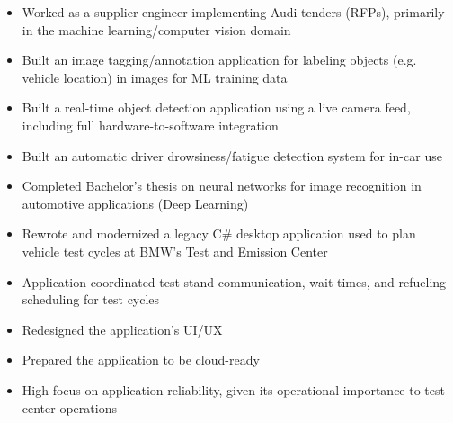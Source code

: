 \documentclass[]{project-reference}
\begin{document}
\projectsep



\begin{itemize}
  \item Worked as a supplier engineer implementing Audi tenders (RFPs), primarily in the machine learning/computer vision domain
  \item Built an image tagging/annotation application for labeling objects (e.g. vehicle location) in images for ML training data
  \item Built a real-time object detection application using a live camera feed, including full hardware-to-software integration
  \item Built an automatic driver drowsiness/fatigue detection system for in-car use
  \item Completed Bachelor's thesis on neural networks for image recognition in automotive applications (Deep Learning)
\end{itemize}

\projectsep



\begin{itemize}
  \item Rewrote and modernized a legacy C\# desktop application used to plan vehicle test cycles at BMW's Test and Emission Center
  \item Application coordinated test stand communication, wait times, and refueling scheduling for test cycles
  \item Redesigned the application's UI/UX
  \item Prepared the application to be cloud-ready
  \item High focus on application reliability, given its operational importance to test center operations
\end{itemize}
\end{document}
